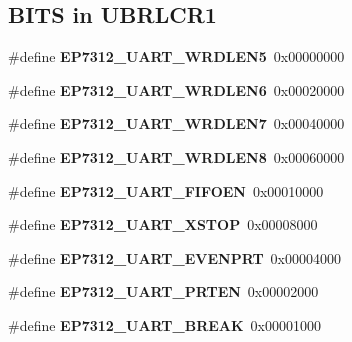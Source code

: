 \subsection*{B\+I\+TS in U\+B\+R\+L\+C\+R1}
\begin{DoxyCompactItemize}
\item 
\mbox{\label{group__edb7312__registers_gaa854cc4f7cb0b106fcffeb2ad03345c5}} 
\#define {\bfseries E\+P7312\+\_\+\+U\+A\+R\+T\+\_\+\+W\+R\+D\+L\+E\+N5}~0x00000000
\item 
\mbox{\label{group__edb7312__registers_gac2cfc45f7af5b9c47f6b66175f96642f}} 
\#define {\bfseries E\+P7312\+\_\+\+U\+A\+R\+T\+\_\+\+W\+R\+D\+L\+E\+N6}~0x00020000
\item 
\mbox{\label{group__edb7312__registers_ga1f9bcfb637d2e89de212c0951d0560e7}} 
\#define {\bfseries E\+P7312\+\_\+\+U\+A\+R\+T\+\_\+\+W\+R\+D\+L\+E\+N7}~0x00040000
\item 
\mbox{\label{group__edb7312__registers_ga94b0d70be8c9560e1ed78dc45d7dfb6b}} 
\#define {\bfseries E\+P7312\+\_\+\+U\+A\+R\+T\+\_\+\+W\+R\+D\+L\+E\+N8}~0x00060000
\item 
\mbox{\label{group__edb7312__registers_gad46db7a9d2e5d0f300267c51b97c31b5}} 
\#define {\bfseries E\+P7312\+\_\+\+U\+A\+R\+T\+\_\+\+F\+I\+F\+O\+EN}~0x00010000
\item 
\mbox{\label{group__edb7312__registers_ga06728c0bb73ff4cc85acb1e49d769c24}} 
\#define {\bfseries E\+P7312\+\_\+\+U\+A\+R\+T\+\_\+\+X\+S\+T\+OP}~0x00008000
\item 
\mbox{\label{group__edb7312__registers_gacf52127b5bd511fac67432bad68094ae}} 
\#define {\bfseries E\+P7312\+\_\+\+U\+A\+R\+T\+\_\+\+E\+V\+E\+N\+P\+RT}~0x00004000
\item 
\mbox{\label{group__edb7312__registers_gadaeb03fd065c1c1276308c06d91829b7}} 
\#define {\bfseries E\+P7312\+\_\+\+U\+A\+R\+T\+\_\+\+P\+R\+T\+EN}~0x00002000
\item 
\mbox{\label{group__edb7312__registers_gaf768b986c863f70c119ecbe26f6c064b}} 
\#define {\bfseries E\+P7312\+\_\+\+U\+A\+R\+T\+\_\+\+B\+R\+E\+AK}~0x00001000
\end{DoxyCompactItemize}
